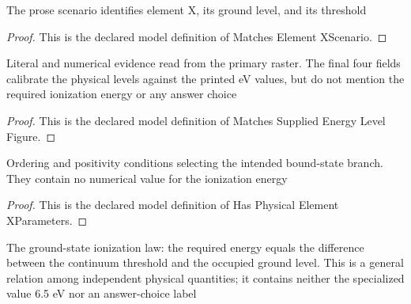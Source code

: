 \begin{definition}
  \label{def:physics:phyx-mini-0644:phyxminiproblems-problemphyxmini0644-matcheselementxscenario}
  The prose scenario identifies element X, its ground level, and its threshold
\end{definition}
\begin{proof}
  This is the declared model definition of Matches Element XScenario.
\end{proof}
\begin{definition}
  \label{def:physics:phyx-mini-0644:phyxminiproblems-problemphyxmini0644-matchessuppliedenergylevelfigure}
  Literal and numerical evidence read from the primary raster. The final four fields calibrate the physical levels against the printed eV values, but do not mention the required ionization energy or any answer choice
\end{definition}
\begin{proof}
  This is the declared model definition of Matches Supplied Energy Level Figure.
\end{proof}
\begin{definition}
  \label{def:physics:phyx-mini-0644:phyxminiproblems-problemphyxmini0644-hasphysicalelementxparameters}
  Ordering and positivity conditions selecting the intended bound-state branch. They contain no numerical value for the ionization energy
\end{definition}
\begin{proof}
  This is the declared model definition of Has Physical Element XParameters.
\end{proof}
\begin{definition}
  \label{def:physics:phyx-mini-0644:phyxminiproblems-problemphyxmini0644-satisfiesgroundstateionizationlaw}
  The ground-state ionization law: the required energy equals the difference between the continuum threshold and the occupied ground level. This is a general relation among independent physical quantities; it contains neither the specialized value 6.5 eV nor an answer-choice label
\end{definition}
